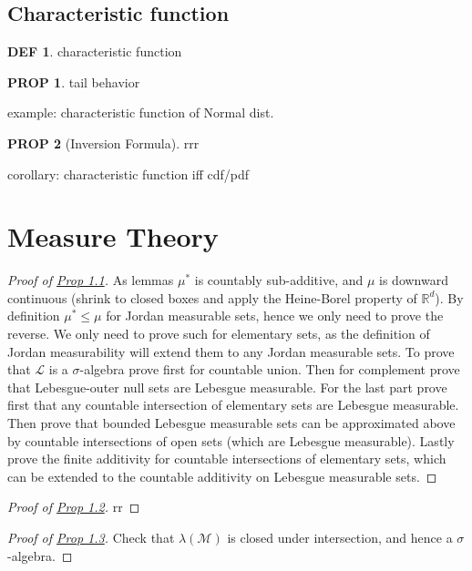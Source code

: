 \documentclass[hidelinks,11pt]{article}
\theoremstyle{definition}
\newtheorem*{defin}{DEF}
\theoremstyle{dotles}
\theoremstyle{dotless}
\newtheorem{prop}{PROP}[section]
\theoremstyle{remark}
\begin{document}
\subsection{Characteristic function}

\begin{defin}
characteristic function
\end{defin}

\begin{prop}
tail behavior
\end{prop}

example: characteristic function of Normal dist.

\begin{prop}[Inversion Formula]
rrr
\end{prop}

corollary: characteristic function iff cdf/pdf

\newpage
\appendix
\section{Measure Theory}
\begin{proof}[Proof of {\textup{\hyperref[Prop 1.1]{Prop 1.1}}}]
As lemmas $\mu^*$ is countably sub-additive, and $\mu$ is downward continuous (shrink to closed boxes and apply the Heine-Borel property of $\mathbb{R}^d$).\medbreak
By definition $\mu^*\leq\mu$ for Jordan measurable sets, hence we only need to prove the reverse. We only need to prove such for elementary sets, as the definition of Jordan measurability will extend them to any Jordan measurable sets.\medbreak
To prove that $\mathcal{L}$ is a $\sigma$-algebra prove first for countable union. Then for complement prove that Lebesgue-outer null sets are Lebesgue measurable.\medbreak
For the last part prove first that any countable intersection of elementary sets are Lebesgue measurable. Then prove that bounded Lebesgue measurable sets can be approximated above by countable intersections of open sets (which are Lebesgue measurable). Lastly prove the finite additivity for countable intersections of elementary sets, which can be extended to the countable additivity on Lebesgue measurable sets.
\end{proof}

\begin{proof}[Proof of {\textup{\hyperref[Prop 1.2]{Prop 1.2}}}]
rr
\end{proof}

\begin{proof}[Proof of {\textup{\hyperref[Prop 1.3]{Prop 1.3}}}]
Check that $\lambda(\mathcal{M})$ is closed under intersection, and hence a $\sigma$-algebra.
\end{proof}
\end{document}
